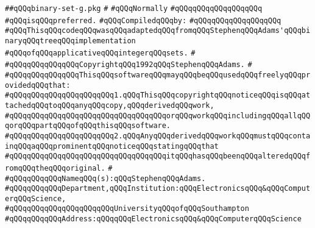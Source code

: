 \label{src/lib/src/binary-set-g.pkg}
\verb|##qQQqbinary-set-g.pkg|\newline
\verb|#|\newline
\verb|#qQQqNormally|\newline
\verb|#qQQqqQQqqQQqqQQqqQQq|\newline
\verb|#qQQqisqQQqpreferred.|\newline
\newline
\verb|#qQQqCompiledqQQqby:|\newline
\verb|#qQQqqQQqqQQqqQQqqQQq|\newline
\newline
\verb|#qQQqThisqQQqcodeqQQqwasqQQqadaptedqQQqfromqQQqStephenqQQqAdams'qQQqbinaryqQQqtreeqQQqimplementation|\newline
\verb|#qQQqofqQQqapplicativeqQQqintegerqQQqsets.|\newline
\verb|#|\newline
\verb|#qQQqqQQqqQQqqQQqCopyrightqQQq1992qQQqStephenqQQqAdams.|\newline
\verb|#|\newline
\verb|#qQQqqQQqqQQqqQQqThisqQQqsoftwareqQQqmayqQQqbeqQQqusedqQQqfreelyqQQqprovidedqQQqthat:|\newline
\verb|#qQQqqQQqqQQqqQQqqQQqqQQq1.qQQqThisqQQqcopyrightqQQqnoticeqQQqisqQQqattachedqQQqtoqQQqanyqQQqcopy,qQQqderivedqQQqwork,|\newline
\verb|#qQQqqQQqqQQqqQQqqQQqqQQqqQQqqQQqqQQqorqQQqworkqQQqincludingqQQqallqQQqorqQQqpartqQQqofqQQqthisqQQqsoftware.|\newline
\verb|#qQQqqQQqqQQqqQQqqQQqqQQq2.qQQqAnyqQQqderivedqQQqworkqQQqmustqQQqcontainqQQqaqQQqprominentqQQqnoticeqQQqstatingqQQqthat|\newline
\verb|#qQQqqQQqqQQqqQQqqQQqqQQqqQQqqQQqqQQqitqQQqhasqQQqbeenqQQqalteredqQQqfromqQQqtheqQQqoriginal.|\newline
\verb|#|\newline
\verb|#qQQqqQQqqQQqNameqQQq(s):qQQqStephenqQQqAdams.|\newline
\verb|#qQQqqQQqqQQqDepartment,qQQqInstitution:qQQqElectronicsqQQq&qQQqComputerqQQqScience,|\newline
\verb|#qQQqqQQqqQQqqQQqqQQqqQQqUniversityqQQqofqQQqSouthampton|\newline
\verb|#qQQqqQQqqQQqAddress:qQQqqQQqElectronicsqQQq&qQQqComputerqQQqScience|\newline
